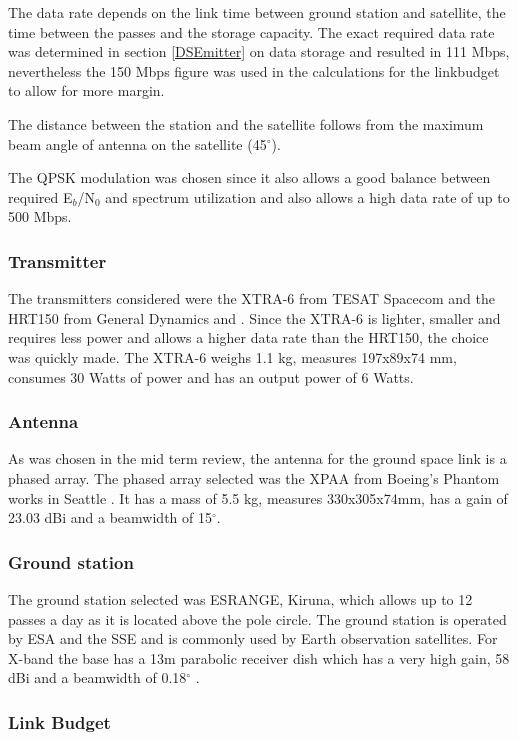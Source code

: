 The data rate depends on the link time between ground station and satellite, the time between the passes and the storage capacity. The exact required data rate was determined in section \ref{DSEmitter} on data storage and resulted in 111 Mbps, nevertheless the 150 Mbps figure was used in the calculations for the linkbudget to allow for more margin.

The distance between the station and the satellite follows from the maximum beam angle of antenna on the satellite (45$^{\circ}$).

The QPSK modulation was chosen since it also allows a good balance between required E$_{b}$/N$_{0}$ and spectrum utilization and also allows a high data rate of up to 500 Mbps.

\subsubsection{Transmitter}
The transmitters considered were the XTRA-6 from TESAT Spacecom \cite{TESATxtra} and the HRT150 from General Dynamics and \cite{GD150}. Since the XTRA-6 is lighter, smaller and requires less power and allows a higher data rate than the HRT150, the choice was quickly made.
The XTRA-6 weighs 1.1 kg, measures 197x89x74 mm, consumes 30 Watts of power and has an output power of 6 Watts.

\subsubsection{Antenna}
As was chosen in the mid term review, the antenna for the ground space link is a phased array. The phased array selected was the XPAA from Boeing's Phantom works in Seattle \cite{XPAA}. It has a mass of 5.5 kg, measures 330x305x74mm, has a gain of 23.03 dBi and a beamwidth of 15$^{\circ}$.
\subsubsection{Ground station}
The ground station selected was ESRANGE, Kiruna, which allows up to 12 passes a day as it is located above the pole circle. The ground station is operated by ESA and the SSE and is commonly used by Earth observation satellites. For X-band the base has a 13m parabolic receiver dish which has a very high gain, 58 dBi and a beamwidth of 0.18$^{\circ}$ \cite{esrange}.

\subsubsection{Link Budget}

